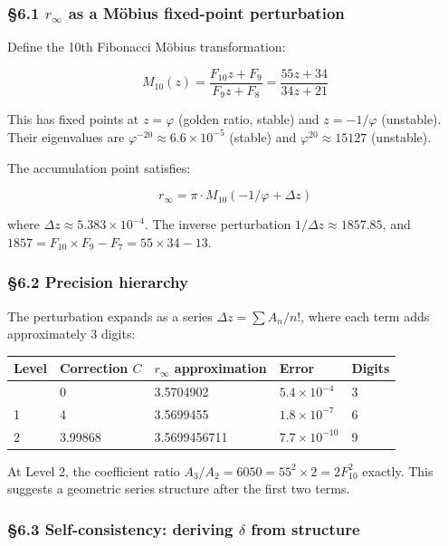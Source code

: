 \documentclass[
  11pt,
  a4paper]{article}
\begin{document}
\subsubsection{\texorpdfstring{§6.1 \(r_\infty\) as a Möbius fixed-point
perturbation}{§6.1 r\_\textbackslash infty as a Möbius fixed-point perturbation}}\label{r_infty-as-a-muxf6bius-fixed-point-perturbation}

Define the 10th Fibonacci Möbius transformation:

\[M_{10}(z) = \frac{F_{10} z + F_9}{F_9 z + F_8} = \frac{55z + 34}{34z + 21}\]

This has fixed points at \(z = \varphi\) (golden ratio, stable) and
\(z = -1/\varphi\) (unstable). Their eigenvalues are
\(\varphi^{-20} \approx 6.6 \times 10^{-5}\) (stable) and
\(\varphi^{20} \approx 15127\) (unstable).

The accumulation point satisfies:

\[r_\infty = \pi \cdot M_{10}(-1/\varphi + \Delta z)\]

where \(\Delta z \approx 5.383 \times 10^{-4}\). The inverse
perturbation \(1/\Delta z \approx 1857.85\), and
\(1857 = F_{10} \times F_9 - F_7 = 55 \times 34 - 13\).

\subsubsection{§6.2 Precision hierarchy}\label{precision-hierarchy}

The perturbation expands as a series \(\Delta z = \sum A_n / n!\), where
each term adds approximately 3 digits:

\begin{longtable}[]{@{}lllll@{}}
\toprule\noalign{}
Level & Correction \(C\) & \(r_\infty\) approximation & Error &
Digits \\
\midrule\noalign{}
\endhead
\bottomrule\noalign{}
\endlastfoot
0 & 0 & 3.5704902 & \(5.4 \times 10^{-4}\) & 3 \\
1 & 4 & 3.5699455 & \(1.8 \times 10^{-7}\) & 6 \\
2 & 3.99868 & 3.5699456711 & \(7.7 \times 10^{-10}\) & 9 \\
\end{longtable}

At Level 2, the coefficient ratio
\(A_3/A_2 = 6050 = 55^2 \times 2 = 2F_{10}^2\) exactly. This suggests a
geometric series structure after the first two terms.

\subsubsection{\texorpdfstring{§6.3 Self-consistency: deriving
\(\delta\) from
structure}{§6.3 Self-consistency: deriving \textbackslash delta from structure}}\label{self-consistency-deriving-delta-from-structure}
\end{document}
